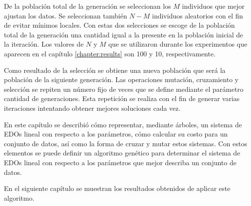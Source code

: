 De la población total de la generación se seleccionan los $M$ individuos que mejor ajustan los datos. Se seleccionan también $N - M$ individuos aleatorios con el fin de evitar mínimos locales. Con estas dos selecciones se escoge de la población total de la generación una cantidad igual a la presente en la población inicial de la iteración. Los valores de $N$ y $M$ que se utilizaron durante los experimentos que aparecen en el capítulo \ref{chapter:results} son 100 y 10, respectivamente.

Como resultado de la selección se obtiene una nueva población que será la población de la siguiente generación. Las operaciones mutación, cruzamiento y selección se repiten un número fijo de veces que se define mediante el parámetro cantidad de generaciones. Esta repetición se realiza con el fin de generar varias iteraciones intentando obtener mejores soluciones cada vez.

En este capítulo se describió cómo representar, mediante árboles, un sistema de EDOs lineal con respecto a los parámetros, cómo calcular su costo para un conjunto de datos, así como la forma de cruzar y mutar estos sistemas. Con estos elementos se puede definir un algoritmo genético para determinar el sistema de EDOs lineal con respecto a los parámetros que mejor describa un conjunto de datos.

En el siguiente capítulo se muestran los resultados obtenidos de aplicar este algoritmo.